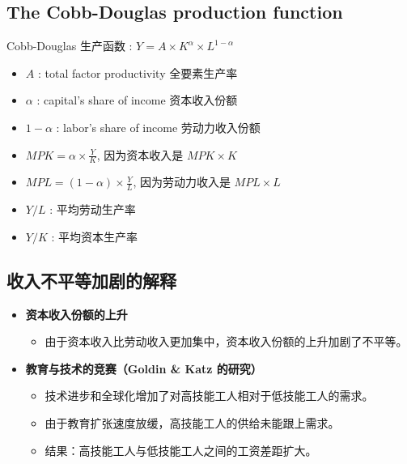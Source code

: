 \subsection{The Cobb-Douglas production function}
\begin{definition}
    Cobb-Douglas 生产函数 : $Y = A \times K^{\alpha} \times L^{1-\alpha}$
\end{definition}
\begin{note}
    \begin{itemize}
        \item $A$ : total factor productivity 全要素生产率
        \item $\alpha$ : capital's share of income 资本收入份额
        \item $1-\alpha$ : labor's share of income 劳动力收入份额
    \end{itemize}
\end{note}
\begin{theorem}
    \begin{itemize}
        \item $MPK = \alpha \times \frac{Y}{K}$, 因为资本收入是 $MPK \times K$
        \item $MPL = (1-\alpha) \times \frac{Y}{L}$, 因为劳动力收入是 $MPL \times L$
    \end{itemize}
\end{theorem}
\begin{itemize}
    \item $Y/L$ : 平均劳动生产率
    \item $Y/K$ : 平均资本生产率
\end{itemize}

\subsection{收入不平等加剧的解释}
\begin{itemize}
    \item \textbf{资本收入份额的上升}
    \begin{itemize}
        \item 由于资本收入比劳动收入更加集中，资本收入份额的上升加剧了不平等。
    \end{itemize}

    \item \textbf{教育与技术的竞赛（Goldin \& Katz 的研究）}
    
\begin{itemize}
        \item 技术进步和全球化增加了对高技能工人相对于低技能工人的需求。
        \item 由于教育扩张速度放缓，高技能工人的供给未能跟上需求。
        \item 结果：高技能工人与低技能工人之间的工资差距扩大。
    \end{itemize}
\end{itemize}

